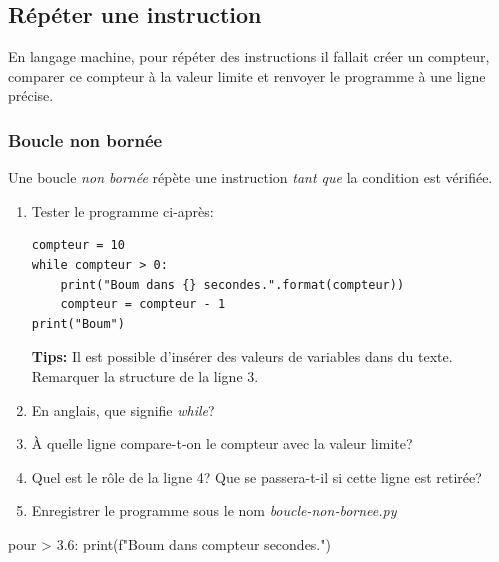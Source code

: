 \documentclass[a4paper,11pt]{article}
\begin{document}
\begin{Form}
\subsection{Répéter une instruction}
En langage machine, pour répéter des instructions il fallait créer un compteur, comparer ce compteur à la valeur limite et renvoyer le programme à une ligne précise.
\subsubsection{Boucle non bornée}
Une boucle \emph{non bornée} répète une instruction \emph{tant que} la condition est vérifiée.
\begin{activite}
\begin{enumerate}
\item Tester le programme ci-après:
\begin{lstlisting}
compteur = 10
while compteur > 0:
    print("Boum dans {} secondes.".format(compteur))
    compteur = compteur - 1
print("Boum")
\end{lstlisting}
\textbf{Tips:} Il est possible d'insérer des valeurs de variables dans du texte. Remarquer la structure de la ligne 3.
\item En anglais, que signifie \emph{while}?
\item À quelle ligne compare-t-on le compteur avec la valeur limite?
\item Quel est le rôle de la ligne 4? Que se passera-t-il si cette ligne est retirée?
\item Enregistrer le programme sous le nom \emph{boucle-non-bornee.py}
\end{enumerate}
\end{activite}
\begin{commentprof}
pour > 3.6: print(f"Boum dans {compteur} secondes.")
\end{commentprof}

\end{Form}
\end{document}
